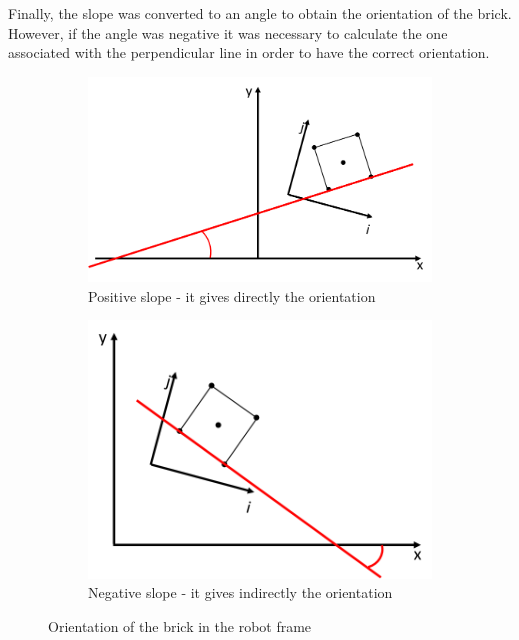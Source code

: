 Finally, the slope was converted to an angle to obtain the orientation of the brick. However, if the angle was negative it was necessary to calculate the one associated with the perpendicular line in order to have the correct orientation.

\begin{figure}[h]
 
\begin{subfigure}{0.5\textwidth}
\captionsetup{justification=centering}
\includegraphics[scale=0.5]{figures/posit_slope.png}
\centering
\caption{Positive slope - it gives directly the orientation}
\label{fig:subim1}
\end{subfigure}
\begin{subfigure}{0.5\textwidth}
\captionsetup{justification=centering}
\includegraphics[scale=0.5]{figures/neg_slope.png}
\centering
\caption{Negative slope - it gives indirectly the orientation}
\label{fig:subim2}
\end{subfigure}
 
\caption{Orientation of the brick in the robot frame}
\label{fig:image2}
\end{figure}
